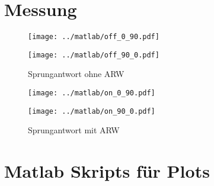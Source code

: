 \documentclass[a4,paper,fleqn]{article}
\begin{document}
\section{Messung}
\begin{figure}[h!]
    \begin{minipage}{0.45\textwidth}
        \centering
        \texttt{[image: ../matlab/off\_0\_90.pdf]}
        \label{fig:off_0_90}
    \end{minipage}
    \begin{minipage}{0.45\textwidth}
        \centering
        \texttt{[image: ../matlab/off\_90\_0.pdf]}
        \label{fig:off_0_90}
    \end{minipage}
    \caption{Sprungantwort ohne ARW}
    \label{fig:off}
\end{figure}
\begin{figure}[h!]
    \begin{minipage}{0.45\textwidth}
        \centering
        \texttt{[image: ../matlab/on\_0\_90.pdf]}
        \label{fig:on_0_90}
    \end{minipage}
    \begin{minipage}{0.45\textwidth}
        \centering
        \texttt{[image: ../matlab/on\_90\_0.pdf]}
        \label{fig:on_0_90}
    \end{minipage}
    \caption{Sprungantwort mit ARW}
    \label{fig:on}
\end{figure}

\clearpage

\appendix
\section{Matlab Skripts für Plots}


\end{document}
